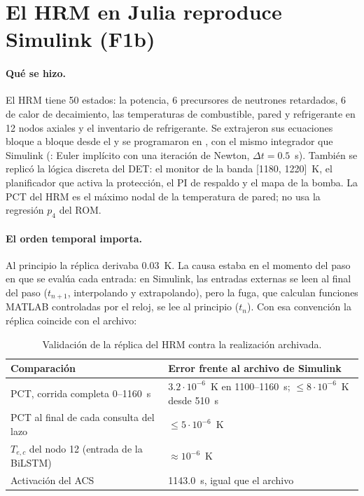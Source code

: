 \section{El HRM en Julia reproduce Simulink (F1b)}\label{sec:hrm}
\paragraph{Qué se hizo.} El HRM tiene 50 estados: la potencia, 6 precursores de neutrones
retardados, 6 de calor de decaimiento, las temperaturas de combustible, pared y refrigerante
en 12 nodos axiales y el inventario de refrigerante. Se extrajeron sus ecuaciones bloque a
bloque desde el  y se programaron en , con el mismo
integrador que Simulink (: Euler implícito con una iteración de Newton,
$\Delta t=0.5$~s). También se replicó la lógica discreta del DET: el monitor de la banda
[1180, 1220]~K, el planificador que activa la protección, el PI de respaldo y el mapa de la
bomba. La PCT del HRM es el máximo nodal de la temperatura de pared; no usa la regresión
$p_4$ del ROM.

\paragraph{El orden temporal importa.} Al principio la réplica derivaba 0.03~K. La causa
estaba en el momento del paso en que se evalúa cada entrada: en Simulink, las entradas
externas se leen al final del paso ($t_{n+1}$, interpolando y extrapolando), pero la fuga,
que calculan funciones MATLAB controladas por el reloj, se lee al principio ($t_n$). Con esa
convención la réplica coincide con el archivo:

\begin{table}[H]\centering\small
\begin{tabularx}{\linewidth}{@{}Y l@{}}\toprule
Comparación & Error frente al archivo de Simulink\\\midrule
PCT, corrida completa 0--1160~s & $3.2\cdot10^{-6}$~K en 1100--1160~s; $\le8\cdot10^{-6}$~K desde 510~s\\
PCT al final de cada consulta del lazo & $\le5\cdot10^{-6}$~K\\
$T_{e,c}$ del nodo 12 (entrada de la BiLSTM) & $\approx10^{-6}$~K\\
Activación del ACS & 1143.0~s, igual que el archivo\\\bottomrule
\end{tabularx}
\caption{Validación de la réplica del HRM contra la realización archivada.}
\end{table}


